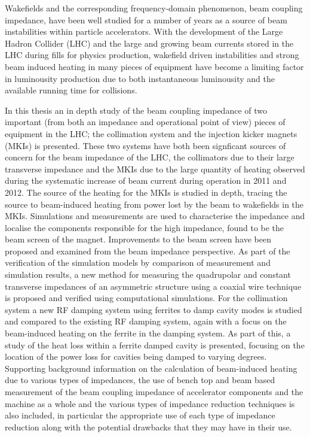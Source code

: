 Wakefields and the corresponding frequency-domain phenomenon, beam coupling impedance, have been well studied for a number of years as a source of beam instabilities within particle accelerators. With the development of the Large Hadron Collider (LHC) and the large and growing beam currents stored in the LHC during fills for physics production, wakefield driven instabilities and strong beam induced heating in many pieces of equipment have become a limiting factor in luminousity production due to both instantaneous luminousity and the available running time for collisions.

In this thesis an in depth study of the beam coupling impedance of two important (from both an impedance and operational point of view) pieces of equipment in the LHC; the collimation system and the injection kicker magnets (MKIs) is presented. These two systems have both been signficant sources of concern for the beam impedance of the LHC, the collimators due to their large transverse impedance and the MKIs due to the large quantity of heating observed during the systematic increase of beam current during operation in 2011 and 2012. The source of the heating for the MKIs is studied in depth, tracing the source to beam-induced heating from power lost by the beam to wakefields in the MKIs. Simulations and measurements are used to characterise the impedance and localise the components responsible for the high impedance, found to be the beam screen of the magnet. Improvements to the beam screen have been proposed and examined from the beam impedance perspective. As part of the verification of the simulation models by comparison of measurement and simulation results, a new method for measuring the quadrupolar and constant transverse impedances of an asymmetric structure using a coaxial wire technique is proposed and verified using computational simulations. For the collimation system a new RF damping system using ferrites to damp cavity modes is studied and compared to the existing RF damping system, again with a focus on the beam-induced heating on the ferrite in the damping system. As part of this, a study of the heat loss within a ferrite damped cavity is presented, focusing on the location of the power loss for cavities being damped to varying degrees. Supporting background information on the calculation of beam-induced heating due to various types of impedances, the use of bench top and beam based measurement of the beam coupling impedance of accelerator components and the machine as a whole and the various types of impedance reduction techniques is also included, in particular the appropriate use of each type of impedance reduction along with the potential drawbacks that they may have in their use.